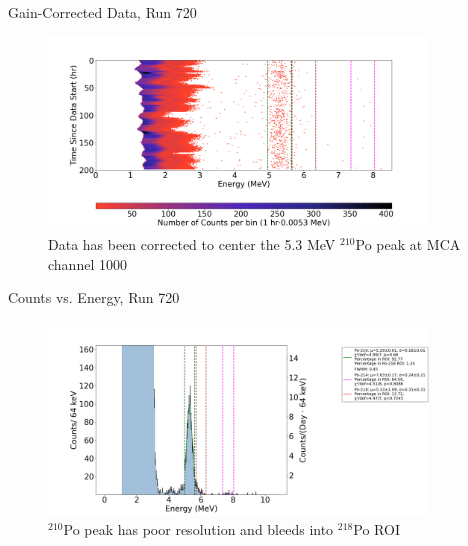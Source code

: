 \documentclass[aspectratio=169]{beamer}
\begin{document}
\begin{frame}{Gain-Corrected Data, Run 720}
    \begin{figure}
        \begin{center}
            \includegraphics[width=0.9\textwidth]
            {assets/720/CD.png}
            \caption{Data has been corrected to center the 5.3 MeV $^{210}$Po peak at MCA channel 1000}
        \end{center}
    \end{figure}
\end{frame}

\begin{frame}{Counts vs. Energy, Run 720}
    \begin{figure}
        \begin{center}
            \includegraphics[width=0.9\textwidth]
            {assets/720/CvE.png}
            \caption{$^{210}$Po peak has poor resolution and bleeds into $^{218}$Po ROI}
        \end{center}
    \end{figure}
\end{frame}
\end{document}
